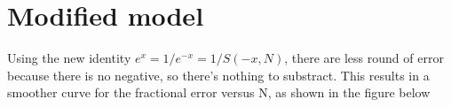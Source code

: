 \documentclass{article}
\begin{document}
\section{Modified model}

Using the new identity $e^x = 1/e^{-x} = 1/S(-x,N)$, there are less round of error because there is no negative, so there's nothing to substract. This results in a smoother curve for the fractional error versus N, as shown in the figure below
\begin{figure}[H]
\end{figure}
\end{document}
